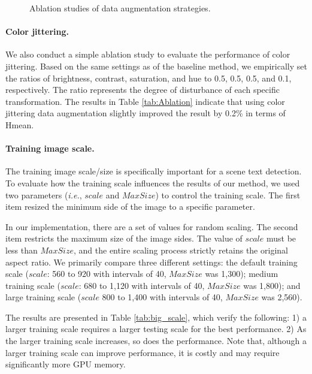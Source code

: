 \begin{figure}[t!]
	\centering
	\caption{Ablation studies of data augmentation strategies.}
	\label{fig:rc_results}
\end{figure}

\paragraph{Color jittering.} We also conduct a simple ablation study to evaluate the performance of color jittering. Based on the same settings as of the baseline method, we empirically set the ratios of brightness, contrast, saturation, and hue to 0.5, 0.5, 0.5, and 0.1, respectively. The ratio represents the degree of disturbance of each specific transformation. The results in Table \ref{tab:Ablation} indicate that using color jittering data augmentation slightly improved the result by 0.2\% in terms of Hmean.



\paragraph{Training image scale.} The training image scale/size is specifically important for a scene text detection. To evaluate how the training scale influences the results of our method, we used two parameters (\textit{i.e.}, $scale$ and $MaxSize$) to control the training scale. The first item resized the minimum side of the image to a specific parameter. 

In our implementation, there are a set of values for random scaling. The second item restricts the maximum size of the image sides. The value of $scale$ must be less than $MaxSize$, and the entire scaling process strictly retains the original aspect ratio. We primarily compare three different settings: the default training scale ($scale$: 560 to 920 with intervals of 40, $MaxSize$ was 1,300); medium training scale ($scale$: 680 to 1,120 with intervals of 40, $MaxSize$ was 1,800); and large training scale ($scale$ 800 to 1,400 with intervals of 40, $MaxSize$ was 2,560). 

The results are presented in Table \ref{tab:big_scale}, which verify the following: 1) a larger training scale requires a larger testing scale for the best performance. 2) As the larger training scale increases, so does the performance. Note that, although a larger training scale can improve performance, it is costly and may require significantly more GPU memory.

